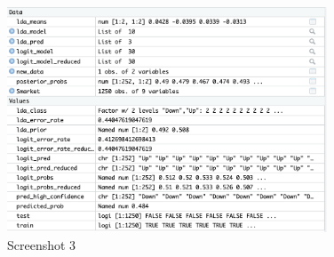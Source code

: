 \documentclass[12pt]{article}
\theoremstyle{definition}
\begin{document}
\begin{figure}[htbp]
    \centering
    \includegraphics[width=0.85\textwidth]{Screenshot_2025-03-02_at_3.56.51_PM.png}
    \caption{Screenshot 3}
    \label{fig:screenshot3}
\end{figure}
\end{document}
